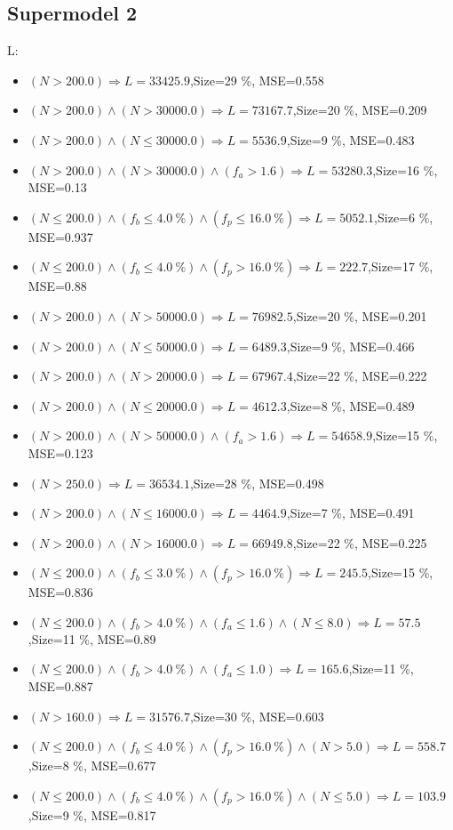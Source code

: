\documentclass[numbered]{CSL}
\begin{document}
\subsection{Supermodel 2}
L:
\begin{itemize}
\item $(N > 200.0) \Rightarrow L = 33425.9$,\hfill Size=29 \%, MSE=0.558
\item $(N > 200.0) \land (N > 30000.0) \Rightarrow L = 73167.7$,\hfill Size=20 \%, MSE=0.209
\item $(N > 200.0) \land (N \leq 30000.0) \Rightarrow L = 5536.9$,\hfill Size=9 \%, MSE=0.483
\item $(N > 200.0) \land (N > 30000.0) \land (f_a > 1.6) \Rightarrow L = 53280.3$,\hfill Size=16 \%, MSE=0.13
\item $(N \leq 200.0) \land (f_b \leq 4.0~\%) \land (f_p \leq 16.0~\%) \Rightarrow L = 5052.1$,\hfill Size=6 \%, MSE=0.937
\item $(N \leq 200.0) \land (f_b \leq 4.0~\%) \land (f_p > 16.0~\%) \Rightarrow L = 222.7$,\hfill Size=17 \%, MSE=0.88
\item $(N > 200.0) \land (N > 50000.0) \Rightarrow L = 76982.5$,\hfill Size=20 \%, MSE=0.201
\item $(N > 200.0) \land (N \leq 50000.0) \Rightarrow L = 6489.3$,\hfill Size=9 \%, MSE=0.466
\item $(N > 200.0) \land (N > 20000.0) \Rightarrow L = 67967.4$,\hfill Size=22 \%, MSE=0.222
\item $(N > 200.0) \land (N \leq 20000.0) \Rightarrow L = 4612.3$,\hfill Size=8 \%, MSE=0.489
\item $(N > 200.0) \land (N > 50000.0) \land (f_a > 1.6) \Rightarrow L = 54658.9$,\hfill Size=15 \%, MSE=0.123
\item $(N > 250.0) \Rightarrow L = 36534.1$,\hfill Size=28 \%, MSE=0.498
\item $(N > 200.0) \land (N \leq 16000.0) \Rightarrow L = 4464.9$,\hfill Size=7 \%, MSE=0.491
\item $(N > 200.0) \land (N > 16000.0) \Rightarrow L = 66949.8$,\hfill Size=22 \%, MSE=0.225
\item $(N \leq 200.0) \land (f_b \leq 3.0~\%) \land (f_p > 16.0~\%) \Rightarrow L = 245.5$,\hfill Size=15 \%, MSE=0.836
\item $(N \leq 200.0) \land (f_b > 4.0~\%) \land (f_a \leq 1.6) \land (N \leq 8.0) \Rightarrow L = 57.5$,\hfill Size=11 \%, MSE=0.89
\item $(N \leq 200.0) \land (f_b > 4.0~\%) \land (f_a \leq 1.0) \Rightarrow L = 165.6$,\hfill Size=11 \%, MSE=0.887
\item $(N > 160.0) \Rightarrow L = 31576.7$,\hfill Size=30 \%, MSE=0.603
\item $(N \leq 200.0) \land (f_b \leq 4.0~\%) \land (f_p > 16.0~\%) \land (N > 5.0) \Rightarrow L = 558.7$,\hfill Size=8 \%, MSE=0.677
\item $(N \leq 200.0) \land (f_b \leq 4.0~\%) \land (f_p > 16.0~\%) \land (N \leq 5.0) \Rightarrow L = 103.9$,\hfill Size=9 \%, MSE=0.817
\end{itemize}
\end{document}
